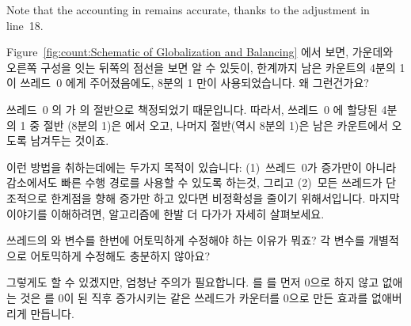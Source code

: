 \begin{enumerate}
	Note that the accounting in  remains accurate,
	thanks to the adjustment in line~18.
	\fi

\QuickQ{}
	Figure~\ref{fig:count:Schematic of Globalization and Balancing} 에서
	보면, 가운데와 오른쪽 구성을 잇는 뒤쪽의 점선을 보면 알 수 있듯이,
	한계까지 남은 카운트의 4분의 1이 쓰레드~0 에게 주어졌음에도, 8분의 1
	만이 사용되었습니다.
	왜 그런건가요?

\QuickA{}
	쓰레드~0 의  가  의 절반으로 책정되었기
	때문입니다.
	따라서, 쓰레드~0 에 할당된 4분의 1 중 절반 (8분의 1)은 
	에서 오고, 나머지 절반(역시 8분의 1)은 남은 카운트에서 오도록 남겨두는
	것이죠.

	이런 방법을 취하는데에는 두가지 목적이 있습니다:
	(1)~쓰레드~0가 증가만이 아니라 감소에서도 빠른 수행 경로를 사용할 수
	있도록 하는것, 그리고
	(2)~모든 쓰레드가 단조적으로 한계점을 향해 증가만 하고 있다면
	비정확성을 줄이기 위해서입니다.
	마지막 이야기를 이해하려면, 알고리즘에 한발 더 다가가 자세히
	살펴보세요.

\QuickQ{}
	쓰레드의  와  변수를 한번에 어토믹하게
	수정해야 하는 이유가 뭐죠?
	각 변수를 개별적으로 어토믹하게 수정해도 충분하지 않아요?

\QuickA{}
	그렇게도 할 수 있겠지만, 엄청난 주의가 필요합니다.
	 를  를 먼저 0으로 하지 않고 없애는 것은
	 를 0이 된 직후 증가시키는 같은 쓰레드가 카운터를 0으로
	만든 효과를 없애버리게 만듭니다.


\end{enumerate}
